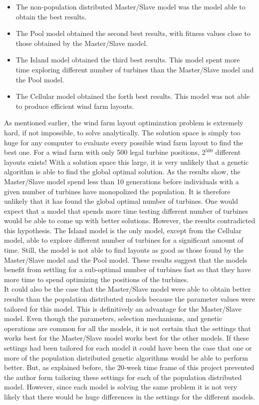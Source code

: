 \begin{itemize}
\item The non-population distributed Master/Slave model was the model able to obtain the best results. 
\item The Pool model obtained the second best results, with fitness values close to those obtained by the Master/Slave model.
\item The Island model obtained the third best results. This model spent more time exploring different number of turbines than the Master/Slave model and the Pool model.
\item The Cellular model obtained the forth best results. This model was not able to produce efficient wind farm layouts.
\end{itemize}

\noindent As mentioned earlier, the wind farm layout optimization problem is extremely hard, if not impossible, to solve analytically. The solution space is simply too huge for any computer to evaluate every possible wind farm layout to find the best one. For a wind farm with only 500 legal turbine positions, 2$^{500}$ different layouts exists! With a solution space this large, it is very unlikely that a genetic algorithm is able to find the global optimal solution. As the results show, the Master/Slave model spend less than 10 generations before individuals with a given number of turbines have monopolized the population. It is therefore unlikely that it has found the global optimal number of turbines. One would expect that a model that spends more time testing different number of turbines would be able to come up with better solutions. However, the results contradicted this hypothesis. The Island model is the only model, except from the Cellular model, able to explore different number of turbines for a significant amount of time. Still, the model is not able to find layouts as good as those found by the Master/Slave model and the Pool model. These results suggest that the models benefit from settling for a sub-optimal number of turbines fast so that they have more time to spend optimizing the positions of the turbines.\\

\noindent It could also be the case that the Master/Slave model were able to obtain better results than the population distributed models because the parameter values were tailored for this model. This is definitively an advantage for the Master/Slave model. Even though the parameters, selection mechanisms, and genetic operations are common for all the models, it is not certain that the settings that works best for the Master/Slave model works best for the other models. If these settings had been tailored for each model it could have been the case that one or more of the population distributed genetic algorithms would be able to perform better. But, as explained before, the 20-week time frame of this project prevented the author form tailoring these settings for each of the population distributed model. However, since each model is solving the same problem it is not very likely that there would be huge differences in the settings for the different models.\\

